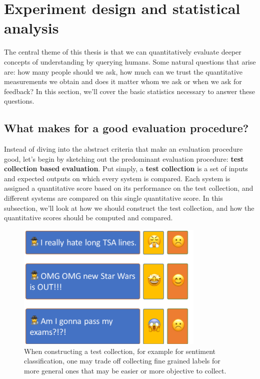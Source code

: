 \section{\label{sec:setup:statistical} Experiment design and statistical analysis}

The central theme of this thesis is that we can quantitatively evaluate deeper concepts of understanding by querying humans.
Some natural questions that arise are: how many people should we ask, how much can we trust the quantitative measurements we obtain and does it matter whom we ask or when we ask for feedback?
In this section, we'll cover the basic statistics necessary to answer these questions.

\subsection{What makes for a good evaluation procedure?}

Instead of diving into the abstract criteria that make an evaluation procedure good, let's begin by sketching out the predominant evaluation procedure: \textbf{test collection based evaluation}.
Put simply, a \textbf{test collection} is a set of inputs and expected outputs on which every system is compared.
Each system is assigned a quantitative score based on its performance on the test collection, and different systems are compared on this single quantitative score.
In this subsection, we'll look at how we should construct the test collection, and how the quantitative scores should be computed and compared.

\begin{figure}
  \centering
  \includegraphics[width=0.8\textwidth]{figures/sentiment-choices}
  \caption[Constructing test collections]{\label{setup:sentiment-choices} When constructing a test collection, for example for sentiment classification, one may trade off collecting fine grained labels for more general ones that may be easier or more objective to collect.}
\end{figure}

